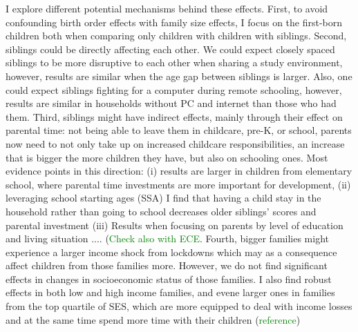 I explore different potential mechanisms behind these effects. First, to avoid confounding birth order effects with family size effects, I focus on the first-born children both when comparing only children with children with siblings. Second, siblings could be directly affecting each other. We could expect closely spaced siblings to be more disruptive to each other when sharing a study environment, however, results are similar when the age gap between siblings is larger. Also, one could expect siblings fighting for a computer during remote schooling, however, results are similar in households without PC and internet than those who had them. Third, siblings might have indirect effects, mainly through their effect on parental time: not being able to leave them in childcare, pre-K, or school, parents now need to not only take up on increased childcare responsibilities, an increase that is bigger the more children they have, but also on schooling ones. Most evidence points in this direction: (i) results are larger in children from elementary school, where parental time investments are more important for development, (ii) leveraging school starting ages (SSA) I find that having a child stay in the household rather than going to school decreases older siblings' scores and parental investment (iii) Results when focusing on parents by level of education and living situation .... (\textcolor{green}{Check also with ECE}. Fourth, bigger families might experience a larger income shock from lockdowns which may as a consequence affect children from those families more. However, we do not find significant effects in changes in socioeconomic status of those families. I also find robust effects in both low and high income families, and evene larger ones in families from the top quartile of SES, which are more equipped to deal with income losses and at the same time spend more time with their children (\textcolor{green}{reference})







